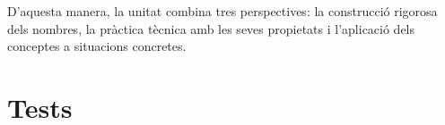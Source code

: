 \documentclass[12pt,a4paper,oneside]{book}
\begin{document}
D'aquesta manera, la unitat combina tres perspectives: la construcció rigorosa dels nombres, la pràctica tècnica amb les seves propietats i l'aplicació dels conceptes a situacions concretes.


\let\cleardoublepage\clearpage

\mainmatter





\chapter{Tests}
\label{cap:tests}

\begin{Form}




\end{Form}

\backmatter
\end{document}
